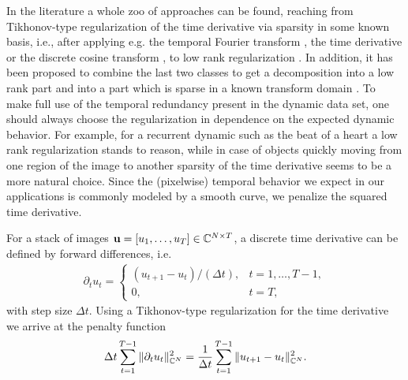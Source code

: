 In the literature a whole zoo of approaches can be found, reaching from Tikhonov-type regularization of the time derivative \cite{Adluru2007,Adluru2007_2} via sparsity in some known basis, i.e., \cite{Lustig:ktSPARSE} after applying e.g. the temporal Fourier transform \cite{Tremoulheac:lowRankPlusSparsePrior}, the time derivative \cite{feng2014,wundrak2016} or the discrete cosine transform \cite{fang2016high}, to low rank regularization \cite{Yao:nuclearNormdMRI}. 
In addition, it has been proposed to combine the last two classes to get a decomposition into a low rank part and into a part which is sparse in a known transform domain \cite{Tremoulheac:lowRankPlusSparsePrior,Otazo:lowRankPlusSparseMatrixDecomposition}.
To make full use of the temporal redundancy present in the dynamic data set, one should always choose the regularization in dependence on the expected dynamic behavior. 
For example, for a recurrent dynamic such as the beat of a heart a low rank regularization stands to reason, while in case of objects quickly moving from one region of the image to another sparsity of the time derivative seems to be a more natural choice.
Since the (pixelwise) temporal behavior we expect in our applications is commonly modeled by a smooth curve, we penalize the squared time derivative. 

For a stack of images $\mathbf{u} = [u_1, \dots, u_T] \in \mathbb{C}^{N \times T}$, a discrete time derivative can be defined by forward differences, i.e.
\begin{align*}
	\partial_t u_t = \begin{cases}
    	(u_{t+1} - u_t)/(\Delta t), & t = 1, \dots, T-1, \\
        0, & t = T,
	\end{cases} 
\end{align*}
with step size $\Delta t$.
Using a Tikhonov-type regularization for the time derivative we arrive at the penalty function 
\begin{align*}
	\Delta t \sum_{t = 1}^{T-1} \| \partial_t u_t \|_{\mathbb{C}^N}^2 = \frac{1}{\Delta t} \sum_{t = 1}^{T-1}  \| u_{t+1} - u_t \|_{\mathbb{C}^N}^2.
\end{align*}


